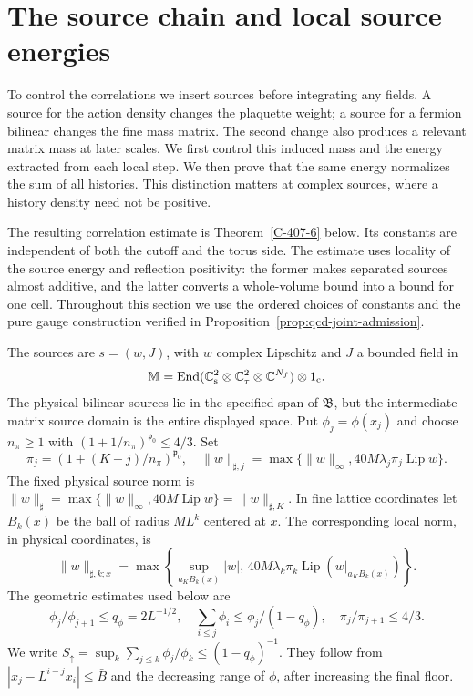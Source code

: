 \documentclass[11pt,letterpaper,reqno]{amsart}
\theoremstyle{definition}
\theoremstyle{remark}
\begin{document}
\section{The source chain and local source energies}

To control the correlations we insert sources before integrating any
fields.  A source for the action density changes the plaquette weight;
a source for a fermion bilinear changes the fine mass matrix.  The
second change also produces a relevant matrix mass at later scales.
We first control this induced mass and the energy extracted from each
local step.  We then prove that the same energy normalizes the sum of
all histories.  This distinction matters at complex sources, where a
history density need not be positive.

The resulting correlation estimate is Theorem~\ref{C-407-6} below.
Its constants are independent of both the cutoff and the torus side.
The estimate uses locality of the source energy and reflection
positivity: the former makes separated sources almost additive, and
the latter converts a whole-volume bound into a bound for one cell.
Throughout this section we use the ordered choices of constants
and the pure gauge construction verified in
Proposition~\ref{prop:qcd-joint-admission}.

The sources are $s=(w,J)$, with $w$ complex Lipschitz and $J$
a bounded field in
\[
 \mathbb M=\operatorname{End}(\mathbb C^2_{\rm s}\otimes
 \mathbb C^2_\tau\otimes\mathbb C^{N_f})\otimes1_{\rm c}.
\]
The physical bilinear sources lie in the specified span of
$\mathfrak B$, but the intermediate matrix source domain is
the entire displayed space. Put $\phi_j=\phi(x_j)$ and choose
$n_\pi\ge1$ with $(1+1/n_\pi)^{\mathfrak p_0}\le4/3$.
Set
\[
 \pi_j=(1+(K-j)/n_\pi)^{\mathfrak p_0},\quad
 \|w\|_{\sharp,j}=\max\{\|w\|_\infty,
                     40M\lambda_j\pi_j\operatorname{Lip}w\}.
\]
The fixed physical source norm is
$\|w\|_\sharp=\max\{\|w\|_\infty,40M\operatorname{Lip}w\}
=\|w\|_{\sharp,K}$.
In fine lattice coordinates let $B_k(x)$ be the ball of
radius $ML^k$ centered at $x$. The corresponding local norm, in physical coordinates, is
\[
 \|w\|_{\sharp,k;x}=\max\left\{
 \sup_{a_KB_k(x)}|w|,\,
 40M\lambda_k\pi_k\operatorname{Lip}(w|_{a_KB_k(x)})\right\}.
\]
The geometric estimates used below are
\begin{equation}\label{eq:qcd-source-geometry}
 \phi_j/\phi_{j+1}\le q_\phi=2L^{-1/2},\quad
 \sum_{i\le j}\phi_i\le\phi_j/(1-q_\phi),\quad
 \pi_j/\pi_{j+1}\le4/3.
\end{equation}
We write
$S_\uparrow=\sup_k\sum_{j\le k}\phi_j/\phi_k
\le(1-q_\phi)^{-1}$.
They follow from $|x_j-L^{i-j}x_i|\le\bar B$ and the
decreasing range of $\phi$, after increasing the final floor.
\end{document}
